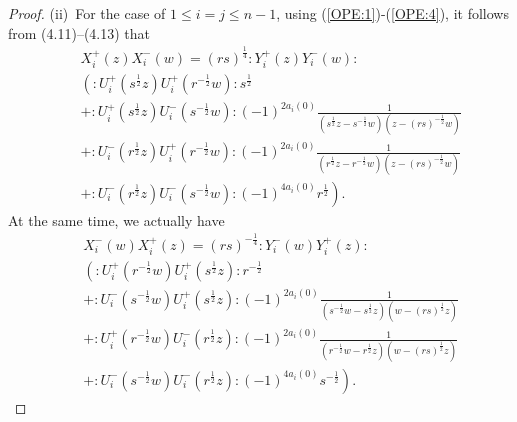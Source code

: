 \documentclass{amsproc}
\theoremstyle{remark}
\numberwithin{equation}{section}
\begin{document}
\begin{proof}
(ii)\ For the case of $1\leqslant i=j\leqslant n-1$,
using (\ref{OPE:1})-(\ref{OPE:4}), it follows from (4.11)--(4.13) that
\begin{eqnarray*}
&&X^+_i(z)X_i^-(w)=(rs)^{\frac{1}{4}}:Y_i^+(z)Y_i^-(w):\\
&&\left(:U_i^+(s^{\frac{1}{2}}z)U_i^+(r^{-\frac{1}{2}}w):s^{\frac{1}{2}}\right. \\
&&+:U_i^+(s^{\frac{1}{2}}z)U_i^-(s^{-\frac{1}{2}}w):(-1)^{2a_i(0)}\frac
1{(s^{\frac{1}{2}}z-s^{-\frac{1}{2}}w)
(z-(rs)^{-\frac{1}{2}}w)} \\
&&+:U_i^-(r^{\frac{1}{2}}z)U_i^+(r^{-\frac{1}{2}}w):(-1)^{2a_i(0)}\frac
1{(r^{\frac{1}{2}}z-r^{-\frac{1}{2}}w)
(z-(rs)^{-\frac{1}{2}}w)} \\
&&+\left.:U_i^-(r^{\frac{1}{2}}z)U_i^-(s^{-\frac{1}{2}}w):(-1)^{4a_i(0)}r^{\frac{1}{2}}\right).
\end{eqnarray*}
At the same time, we actually have
\begin{eqnarray*}
&&X_i^-(w)X^+_i(z)=(rs)^{-\frac{1}{4}}:Y_i^-(w)Y_i^+(z):\\
&&\left(:U_i^+(r^{-\frac{1}{2}}w)U_i^+(s^{\frac{1}{2}}z):r^{-\frac{1}{2}}\right. \\
&&+:U_i^-(s^{-\frac{1}{2}}w)U_i^+(s^{\frac{1}{2}}z):(-1)^{2a_i(0)}\frac
1{(s^{-\frac{1}{2}}w-s^{\frac{1}{2}}z)
(w-(rs)^{\frac{1}{2}}z)} \\
&&+:U_i^+(r^{-\frac{1}{2}}w)U_i^-(r^{\frac{1}{2}}z):(-1)^{2a_i(0)}\frac
1{(r^{-\frac{1}{2}}w-r^{\frac{1}{2}}z)
(w-(rs)^{\frac{1}{2}}z)} \\
&&+\left.:U_i^-(s^{-\frac{1}{2}}w)U_i^-(r^{\frac{1}{2}}z):(-1)^{4a_i(0)}s^{-\frac{1}{2}}\right).
\end{eqnarray*}


\end{proof}
\end{document}
